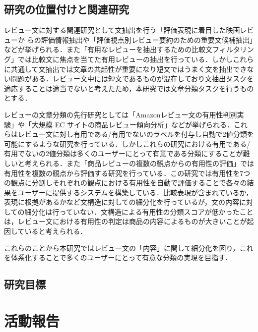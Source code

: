 \documentclass[platex,dvipdfmx,a4paper,twocolumn,base=10.5pt,jbase=10.5pt,ja=standard]{bxjsarticle}
\begin{document}
 \subsection{研究の位置付けと関連研究}
 レビュー文に対する関連研究として文抽出を行う「評価表現に着目した映画レビューか らの評価情報抽出\cite{paper1}や「評価視点別レビュー要約のための重要文候補抽出\cite{paper2}」などが挙げられる．また「有用なレビューを抽出するための比較文フィルタリング\cite{paper3}」では比較文に焦点を当てた有用レビューの抽出を行っている．しかしこれらに共通して文抽出では文章の共起性が重要になり短文ではうまく文を抽出できない問題がある．レビュー文中には短文であるものが混在しており文抽出タスクを適応することは適当でないと考えたため，本研究では文章分類タスクを行うものとする．\par
 レビューの文章分類の先行研究としては「Amazonレビュー文の有用性判別実験\cite{paper4}」や「大規模 EC サイトの商品レビュー傾向分析\cite{paper5}」などが挙げられる．これらはレビュー文に対し有用である/有用でないのラベルを付与し自動で2値分類を可能にするような研究を行っている．しかしこれらの研究における有用である/有用でないの2値分類は多くのユーザーにとって有意である分類にすることが難しいと考えられる．また「商品レビューの複数の観点からの有用性の評価\cite{paper6}」では有用性を複数の観点から評価する研究を行っている．この研究では有用性を7つの観点に分割しそれぞれの観点における有用性を自動で評価することで各々の結果をユーザーに提供するシステムを構築している．比較表現が含まれているか，表現に根拠があるかなど文構造に対しての細分化を行っているが，文の内容に対しての細分化は行っていない．文構造による有用性の分類スコアが低かったことは，レビュー文における有用性の判定は商品の内容によるものが大きいことが起因していると考えられる．\par
 これらのことから本研究ではレビュー文の「内容」に関して細分化を図り，これを体系化することで多くのユーザーにとって有意な分類の実現を目指す．
\subsection{研究目標}
\section{活動報告}
\end{document}
